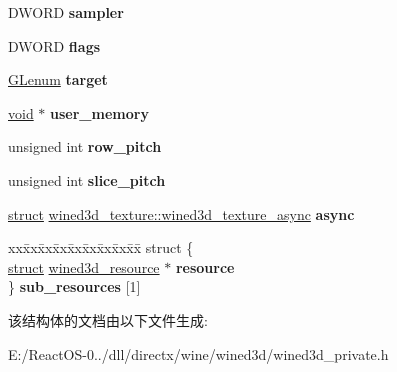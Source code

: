\begin{DoxyCompactItemize}
\mbox{\label{structwined3d__texture_a6381795ef6b68a81e47bdf3c285aee1b}} 
D\+W\+O\+RD {\bfseries sampler}
\item 
\mbox{\label{structwined3d__texture_a5ac96f33f5026368a42854b271ccb317}} 
D\+W\+O\+RD {\bfseries flags}
\item 
\mbox{\label{structwined3d__texture_aabc5693cea77f77cf4fda75842b45350}} 
\hyperlink{interfacevoid}{G\+Lenum} {\bfseries target}
\item 
\mbox{\label{structwined3d__texture_abd6d5ad493f85df16dbbd3df72bed6e2}} 
\hyperlink{interfacevoid}{void} $\ast$ {\bfseries user\+\_\+memory}
\item 
\mbox{\label{structwined3d__texture_a9142d6c9f729e3f1a5df2e62e309fe93}} 
unsigned int {\bfseries row\+\_\+pitch}
\item 
\mbox{\label{structwined3d__texture_a5d0d32e063741029d3dd8c7e43e44392}} 
unsigned int {\bfseries slice\+\_\+pitch}
\item 
\mbox{\label{structwined3d__texture_a51dcaa695566512f3c2dff082638adf9}} 
\hyperlink{interfacestruct}{struct} \hyperlink{structwined3d__texture_1_1wined3d__texture__async}{wined3d\+\_\+texture\+::wined3d\+\_\+texture\+\_\+async} {\bfseries async}
\item 
\mbox{\label{structwined3d__texture_adf0a3ecdd78a313796248892fe557b2d}} 
\begin{tabbing}
xx\=xx\=xx\=xx\=xx\=xx\=xx\=xx\=xx\=\kill
struct \{\\
\>\hyperlink{interfacestruct}{struct} \hyperlink{structwined3d__resource}{wined3d\_resource} $\ast$ {\bfseries resource}\\
\} {\bfseries sub\_resources} \mbox{[}1\mbox{]}\\

\end{tabbing}\end{DoxyCompactItemize}


该结构体的文档由以下文件生成\+:\begin{DoxyCompactItemize}
\item 
E\+:/\+React\+O\+S-\/0../dll/directx/wine/wined3d/wined3d\+\_\+private.\+h\end{DoxyCompactItemize}
